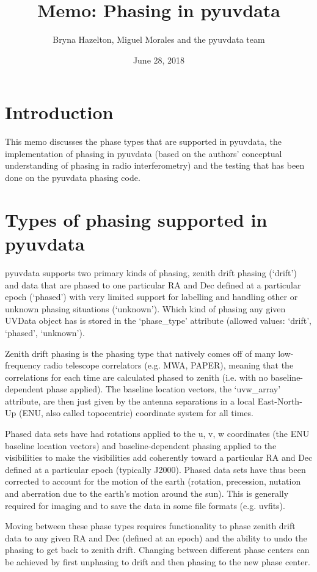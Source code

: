 \documentclass[11pt, oneside]{article}   	%
\title{Memo: Phasing in pyuvdata}
\author{Bryna Hazelton, Miguel Morales and the pyuvdata team}
\date{June 28, 2018}							%
\begin{document}
\maketitle
\section{Introduction}
This memo discusses the phase types that are supported in pyuvdata, the implementation of phasing in pyuvdata (based on the authors' conceptual understanding of phasing in radio interferometry) and the testing that has been done on the pyuvdata phasing code.

\section{Types of phasing supported in pyuvdata}
pyuvdata supports two primary kinds of phasing, zenith drift phasing (`drift') and data that are phased to one particular RA and Dec defined at a particular epoch (`phased') with very limited support for labelling and handling other or unknown phasing situations (`unknown'). Which kind of phasing any given UVData object has is stored in the `phase\_type' attribute (allowed values: `drift', `phased', `unknown').

Zenith drift phasing is the phasing type that natively comes off of many low-frequency radio telescope correlators (e.g. MWA, PAPER), meaning that the correlations for each time are calculated phased to zenith (i.e. with no baseline-dependent phase applied). The baseline location vectors, the `uvw\_array' attribute, are then just given by the antenna separations in a local East-North-Up (ENU, also called topocentric) coordinate system for all times.

Phased data sets have had rotations applied to the u, v, w coordinates (the ENU baseline location vectors) and baseline-dependent phasing applied to the visibilities to make the visibilities add coherently toward a particular RA and Dec defined at a particular epoch (typically J2000). Phased data sets have thus been corrected to account for the motion of the earth (rotation, precession, nutation and aberration due to the earth's motion around the sun). This is generally required for imaging and to save the data in some file formats (e.g. uvfits).

Moving between these phase types requires functionality to phase zenith drift data to any given RA and Dec (defined at an epoch) and the ability to undo the phasing to get back to zenith drift. Changing between different phase centers can be achieved by first unphasing to drift and then phasing to the new phase center.
\end{document}
